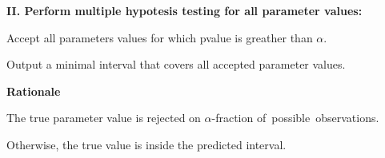 \documentclass[landscape,footrule]{foils}
\begin{document}
\textbf{II. Perform multiple hypotesis testing for all parameter values:}
\begin{triangles}
\item Accept all parameters values for which pvalue is greather than $\alpha$.  
\item Output a minimal interval that covers all accepted parameter values.
\end{triangles}
\vspace*{1cm}

\textbf{Rationale}
\begin{triangles}
\item The true parameter value is rejected on $\alpha$-fraction of~possible~observations.
\item Otherwise, the true value is inside the predicted interval. 
\end{triangles}
\end{document}

